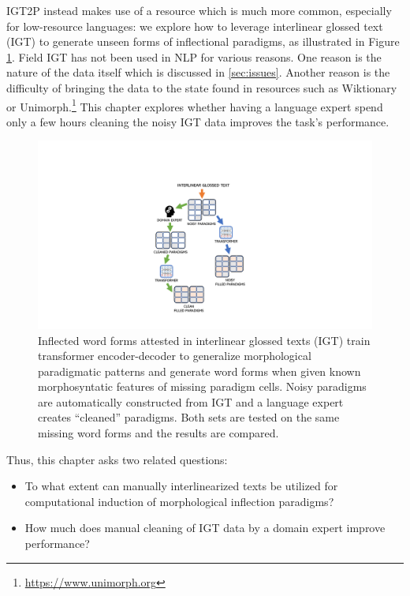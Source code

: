 IGT2P instead makes use of a resource which is much more common, especially for low-resource languages:
we explore how to leverage interlinear glossed text (IGT) to generate unseen forms of inflectional paradigms, as illustrated in Figure \ref{fig:Workflow}. Field IGT has not been used in NLP for various reasons. One reason is the nature of the data itself which is discussed in \ref{sec:issues}. Another reason is the difficulty of bringing the data to the state found in resources such as Wiktionary or Unimorph.\footnote{\url{https://www.unimorph.org}} This chapter explores whether having a language expert spend only a few hours cleaning the noisy IGT data improves the task's performance. 


\begin{figure}
    \centering
    \includegraphics[width=12cm]{figs/IGT-Paradigm-Workflow2.pdf}
    \caption[IGT2P Overview]{Inflected word forms attested in interlinear glossed texts (IGT) train transformer encoder-decoder to generalize morphological paradigmatic patterns and generate word forms when given known morphosyntatic features of missing paradigm cells. Noisy paradigms are automatically constructed from IGT and a language expert creates ``cleaned'' paradigms. Both sets are tested on the same missing word forms and the results are compared.}
    \label{fig:Workflow}
\end{figure}


Thus, this chapter asks two related questions: 
\begin{itemize}
    \item To what extent can manually interlinearized texts be utilized for computational induction of morphological inflection paradigms? 
    \item How much does manual cleaning of IGT data by a domain expert improve performance?
\end{itemize}

